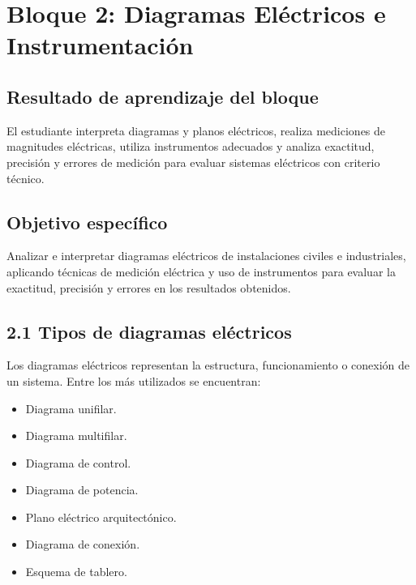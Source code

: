 \documentclass[
  spanish,
  letterpaper,
  DIV=11,
  numbers=noendperiod]{scrreprt}
\providecommand{\tightlist}{%
  \setlength{\itemsep}{0pt}\setlength{\parskip}{0pt}}
\begin{document}

\chapter{Bloque 2: Diagramas Eléctricos e
Instrumentación}\label{bloque-2-diagramas-eluxe9ctricos-e-instrumentaciuxf3n}

\section{Resultado de aprendizaje del
bloque}\label{resultado-de-aprendizaje-del-bloque-1}

El estudiante interpreta diagramas y planos eléctricos, realiza
mediciones de magnitudes eléctricas, utiliza instrumentos adecuados y
analiza exactitud, precisión y errores de medición para evaluar sistemas
eléctricos con criterio técnico.

\section{Objetivo específico}\label{objetivo-especuxedfico}

Analizar e interpretar diagramas eléctricos de instalaciones civiles e
industriales, aplicando técnicas de medición eléctrica y uso de
instrumentos para evaluar la exactitud, precisión y errores en los
resultados obtenidos.

\section{2.1 Tipos de diagramas
eléctricos}\label{tipos-de-diagramas-eluxe9ctricos}

Los diagramas eléctricos representan la estructura, funcionamiento o
conexión de un sistema. Entre los más utilizados se encuentran:

\begin{itemize}
\tightlist
\item
  Diagrama unifilar.
\item
  Diagrama multifilar.
\item
  Diagrama de control.
\item
  Diagrama de potencia.
\item
  Plano eléctrico arquitectónico.
\item
  Diagrama de conexión.
\item
  Esquema de tablero.
\end{itemize}
\end{document}
